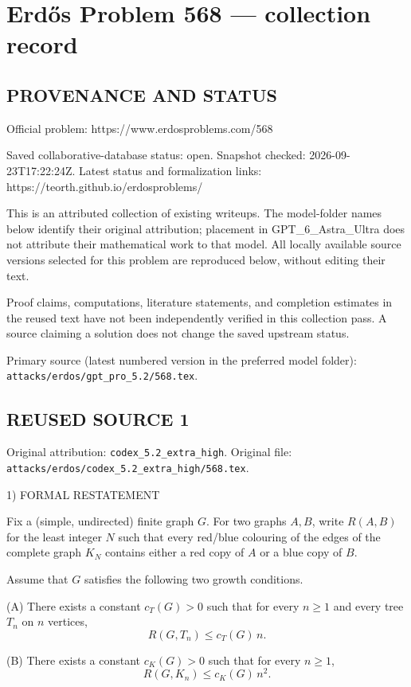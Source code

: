 \section*{Erd\H{o}s Problem 568 --- collection record}

\subsection*{PROVENANCE AND STATUS}
Official problem: https://www.erdosproblems.com/568

Saved collaborative-database status: open.
Snapshot checked: 2026-09-23T17:22:24Z.
Latest status and formalization links: https://teorth.github.io/erdosproblems/

This is an attributed collection of existing writeups. The model-folder names below identify their original attribution; placement in GPT\_6\_Astra\_Ultra does not attribute their mathematical work to that model. All locally available source versions selected for this problem are reproduced below, without editing their text.

Proof claims, computations, literature statements, and completion estimates in the reused text have not been independently verified in this collection pass. A source claiming a solution does not change the saved upstream status.

Primary source (latest numbered version in the preferred model folder): \texttt{attacks/erdos/gpt\_pro\_5.2/568.tex}.

\subsection*{REUSED SOURCE 1}
Original attribution: \texttt{codex\_5.2\_extra\_high}.
Original file: \texttt{attacks/erdos/codex\_5.2\_extra\_high/568.tex}.


1) FORMAL RESTATEMENT

Fix a (simple, undirected) finite graph $G$. For two graphs $A,B$, write $R(A,B)$ for the least integer $N$ such that every red/blue colouring of the edges of the complete graph $K_N$ contains either a red copy of $A$ or a blue copy of $B$.

Assume that $G$ satisfies the following two growth conditions.

(A) There exists a constant $c_T(G)>0$ such that for every $n\ge 1$ and every tree $T_n$ on $n$ vertices,
\[
R(G,T_n) \le c_T(G)\,n.
\]

(B) There exists a constant $c_K(G)>0$ such that for every $n\ge 1$,
\[
R(G,K_n) \le c_K(G)\,n^2.
\]

